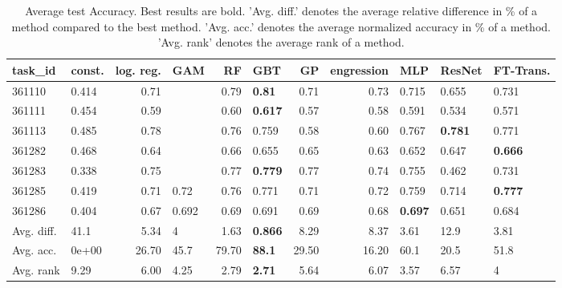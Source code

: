 \begin{table}[ht!]
\centering
\begingroup\footnotesize
\begin{tabular}{llrlrlrrlll}
  \hline
\hline
task\_id & const. & log. reg. & GAM & RF & GBT & GP & engression & MLP & ResNet & FT-Trans. \\ 
  \hline
361110 & 0.414 & 0.71 &  & 0.79 & \textbf{0.81} & 0.71 & 0.73 & 0.715 & 0.655 & 0.731 \\ 
  361111 & 0.454 & 0.59 &  & 0.60 & \textbf{0.617} & 0.57 & 0.58 & 0.591 & 0.534 & 0.571 \\ 
  361113 & 0.485 & 0.78 &  & 0.76 & 0.759 & 0.58 & 0.60 & 0.767 & \textbf{0.781} & 0.771 \\ 
  361282 & 0.468 & 0.64 &  & 0.66 & 0.655 & 0.65 & 0.63 & 0.652 & 0.647 & \textbf{0.666} \\ 
  361283 & 0.338 & 0.75 &  & 0.77 & \textbf{0.779} & 0.77 & 0.74 & 0.755 & 0.462 & 0.731 \\ 
  361285 & 0.419 & 0.71 & 0.72 & 0.76 & 0.771 & 0.71 & 0.72 & 0.759 & 0.714 & \textbf{0.777} \\ 
  361286 & 0.404 & 0.67 & 0.692 & 0.69 & 0.691 & 0.69 & 0.68 & \textbf{0.697} & 0.651 & 0.684 \\ 
   \hline
Avg. diff. & 41.1 & 5.34 & 4 & 1.63 & \textbf{0.866} & 8.29 & 8.37 & 3.61 & 12.9 & 3.81 \\ 
  Avg. acc. & 0e+00 & 26.70 & 45.7 & 79.70 & \textbf{88.1} & 29.50 & 16.20 & 60.1 & 20.5 & 51.8 \\ 
  Avg. rank & 9.29 & 6.00 & 4.25 & 2.79 & \textbf{2.71} & 5.64 & 6.07 & 3.57 & 6.57 & 4 \\ 
   \hline
\hline
\end{tabular}
\endgroup
\caption{Average test Accuracy. 
                  Best results are bold. 
                  'Avg. diff.' denotes the average relative difference in \% of a method compared to the best method.
                  'Avg. acc.' denotes the average normalized accuracy in \% of a method.
                  'Avg. rank' denotes the average rank of a method.} 
\label{TABLES/table_results_Accuracy_clustering_num_and_cat_features}
\end{table}
